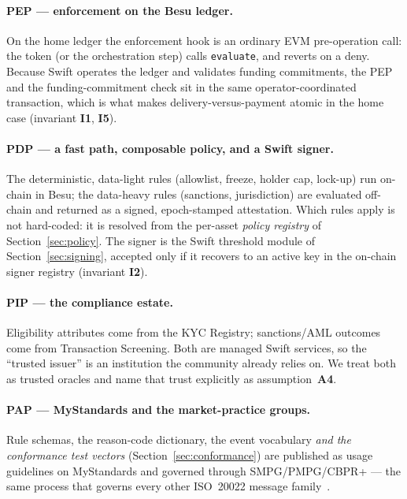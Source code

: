 \documentclass[11pt,a4paper]{article}
\newcommand{\Aref}[1]{\textbf{A#1}}
\newcommand{\Iref}[1]{\textbf{I#1}}
\begin{document}
\paragraph{PEP --- enforcement on the Besu ledger.} On the home ledger the
enforcement hook is an ordinary EVM pre-operation call: the token (or the
orchestration step) calls \texttt{evaluate}, and reverts on a deny. Because Swift
operates the ledger and validates funding commitments, the PEP and the
funding-commitment check sit in the same operator-coordinated transaction, which
is what makes delivery-versus-payment atomic in the home case (invariant
\Iref{1}, \Iref{5}).

\paragraph{PDP --- a fast path, composable policy, and a Swift signer.} The
deterministic, data-light rules (allowlist, freeze, holder cap, lock-up) run
on-chain in Besu; the data-heavy rules (sanctions, jurisdiction) are evaluated
off-chain and returned as a signed, epoch-stamped attestation. Which rules apply
is not hard-coded: it is resolved from the per-asset \emph{policy registry} of
Section~\ref{sec:policy}. The signer is the Swift threshold module of
Section~\ref{sec:signing}, accepted only if it recovers to an active key in the
on-chain signer registry (invariant \Iref{2}).

\paragraph{PIP --- the compliance estate.} Eligibility attributes come from the
KYC Registry; sanctions/AML outcomes come from Transaction Screening. Both are
managed Swift services, so the ``trusted issuer'' is an institution the community
already relies on. We treat both as trusted oracles and name that trust
explicitly as assumption~\Aref{4}.

\paragraph{PAP --- MyStandards and the market-practice groups.} Rule schemas, the
reason-code dictionary, the event vocabulary \emph{and the conformance test
vectors} (Section~\ref{sec:conformance}) are published as usage guidelines on
MyStandards and governed through SMPG/PMPG/CBPR+ --- the same process that governs
every other ISO~20022 message family~\cite{swiftmystd,swiftsmpg}.
\end{document}
